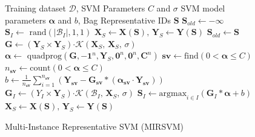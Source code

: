 \documentclass[preprint,12pt]{elsarticle}
\newcommand{\set}[1]{{\left\{#1\right\}}}
\newcommand\tab[1][1cm]{\hspace*{#1}}
\begin{document}
\begin{figure}[tpb!]
\begin{algorithm}[H]
\caption{Multi-Instance Representative SVM (MIRSVM)}
\label{alg:mirsvm} 
\begin{algorithmic}[1]
\renewcommand{\algorithmicrequire}{\textbf{Input:}}
\renewcommand{\algorithmicensure}{\textbf{Output:}}
\Require Training dataset $\mathcal{D}$, SVM Parameters $C$ and $\sigma$
\Ensure  SVM model parameters $\bm \alpha$ and $b$, Bag Representative IDs $\bm S$
\State $\bm S_{old} \leftarrow \bm -\infty$
\For {$I \in \set{1,\ldots,n}$}
\State $\bm S_I \leftarrow \text{ rand}\left(|\mathcal{B}_I|,1,1\right)$ 
\EndFor
\State $\bm X_S \leftarrow \bm X(\bm S),\,\bm Y_S \leftarrow \bm Y(\bm S)$ 
\State $\bm S_{old} \leftarrow \bm S$
\State $\bm G \leftarrow (\bm Y_S \times \bm Y_S) \bm \cdot \mathcal{K}\left( \bm X_S,\,\bm X_S,\,\sigma\right)$ 
\State $\bm \alpha \leftarrow \text{ quadprog}\left(\bm G, \bm{-1}^n, \bm Y_S, \bm 0^n, \bm 0^n, \bm C^n\right)$ 
\State $\bm{sv} \leftarrow \text{find}\left(0 < \bm \alpha \leq C \right)$ 
\State $n_{\bm{sv}} \leftarrow \text{count}\left(0 < \bm \alpha \leq C \right)$ 
\State $b \leftarrow \frac{1}{n_{\bm{sv}}}\sum_{i=1}^{n_{\bm{sv}}} \left(\bm Y_{\bm{sv}} - \bm G_{\bm{sv}}*\left(\bm{\alpha_{\bm{sv}}} \cdot \bm Y_{\bm{sv}}\right)\right)$ 
\For {$I \in \set{1,\ldots,n}$} 
\State $\bm G_I \leftarrow (Y_I \times \bm Y_S) \bm \cdot \mathcal{K}\left( \mathcal{B}_I,\,\bm X_S,\,\sigma\right)$
\State $\bm S_I \leftarrow \text{argmax}_{i \in I}\left(\bm G_I*\bm{\alpha} + b \right)$ \tab\tab[0.62cm]
\EndFor
\State $\bm X_S \leftarrow \bm X(\bm S),\,\bm Y_S \leftarrow \bm Y(\bm S)$ 
\EndWhile 
\end{algorithmic} 
\end{algorithm}
\end{figure}
\end{document}
